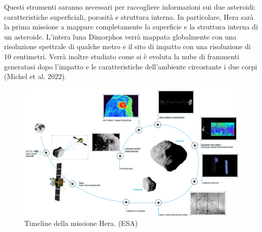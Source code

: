 \documentclass[a4paper,11pt,openright]{book}
\begin{document}
Questi strumenti saranno necessari per raccogliere informazioni sui due asteroidi: caratteristiche superficiali, porosità e struttura interna. In particolare, Hera sarà la prima missione a mappare completamente la superficie e la struttura interna di un asteroide. L'intera luna Dimorphos verrà mappata globalmente con una risoluzione spettrale di qualche metro e il sito di impatto con una risoluzione di 10 centimetri. Verrà inoltre studiato come si è evoluta la nube di frammenti generatasi dopo l'impatto e le caratteristiche dell'ambiente circostante i due corpi (Michel et al. 2022).

\begin{figure}[!h]
    \centering
    \includegraphics[scale=0.57]{figure/Hera_mission_timeline.png}
    \caption[Timeline della missione Hera.]{Timeline della missione Hera. (ESA)}
    \label{fig:hera_timeline}
\end{figure}
\end{document}
